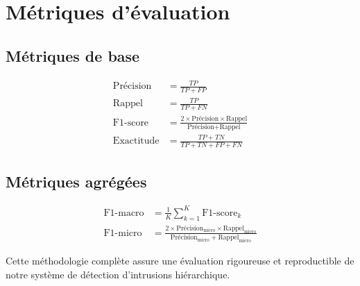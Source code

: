 \section{Métriques d'évaluation}

\subsection{Métriques de base}

\begin{align}
    \text{Précision} &= \frac{TP}{TP + FP} \\
    \text{Rappel} &= \frac{TP}{TP + FN} \\
    \text{F1-score} &= \frac{2 \times \text{Précision} \times \text{Rappel}}{\text{Précision} + \text{Rappel}} \\
    \text{Exactitude} &= \frac{TP + TN}{TP + TN + FP + FN}
\end{align}

\subsection{Métriques agrégées}

\begin{align}
    \text{F1-macro} &= \frac{1}{K}\sum_{k=1}^{K} \text{F1-score}_k \\
    \text{F1-micro} &= \frac{2 \times \text{Précision}_{\text{micro}} \times \text{Rappel}_{\text{micro}}}{\text{Précision}_{\text{micro}} + \text{Rappel}_{\text{micro}}}
\end{align}

Cette méthodologie complète assure une évaluation rigoureuse et reproductible de notre système de détection d'intrusions hiérarchique.

\newpage